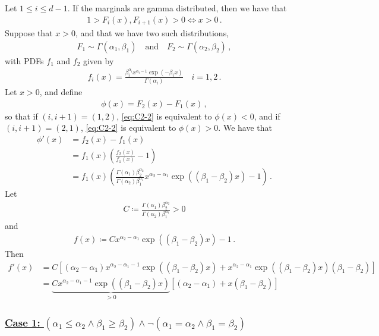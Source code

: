 \documentclass{article}
\begin{document}
%
Let $1 \leq i \leq d - 1$.
If the marginals are gamma distributed, then we have that
%
\begin{align*}
	1 > F_i(x), F_{i+1}(x) > 0 \iff x > 0 \,.
\end{align*}
%
Suppose that $x > 0$, and that we have two such distributions,
%
\begin{align*}
	F_1 \sim \Gamma(\alpha_1, \beta_1) \quad \text{and} \quad
	F_2 \sim \Gamma(\alpha_2, \beta_2) \,,
\end{align*}
%
with PDFs $f_1$ and $f_2$ given by
%
\begin{align*}
	f_i(x) = \frac{\beta_i ^ {\alpha_i} x ^ {\alpha_i - 1}
		\exp(-\beta_i x)}{\Gamma(\alpha_i)} \quad  i = 1, 2 \,.
\end{align*}
%
Let $x > 0$, and define
%
\begin{align*}
	\phi(x) = F_2(x) - F_1(x) \,,
\end{align*}
%
so that if $(i, i + 1) = (1, 2)$,
\eqref{eq:C2-2} is equivalent to $\phi(x) < 0$,
and if $(i, i + 1) = (2, 1)$,
\eqref{eq:C2-2} is equivalent to $\phi(x) > 0$.
%
We have that
%
\begin{align*}
	\phi'(x) &= f_2(x) - f_1(x)\\
	&= f_1(x) \left(\frac{f_2(x)}{f_1(x)} - 1\right)\\
	&= f_1(x) \left(\frac{\Gamma(\alpha_1)\beta ^ {\alpha_2}_2}
		{\Gamma(\alpha_2)\beta ^ {\alpha_1}_1} x^{\alpha_2 - \alpha_1}
		\exp((\beta_1 - \beta_2) x) - 1\right) \,.
\end{align*}
%
Let
%
\begin{align*}
	C \coloneqq \frac{\Gamma(\alpha_1) \beta ^ {\alpha_2}_2}
		{\Gamma(\alpha_2) \beta ^ {\alpha_1}_1} > 0
\end{align*}
%
and
%
\begin{align*}
	f(x) \coloneqq C x ^ {\alpha_2 - \alpha_1}
		\exp((\beta_1 - \beta_2) x) - 1 \,.
\end{align*}
%
Then
%
\begin{align*}
	f'(x) &= C\left[(\alpha_2 - \alpha_1) x ^ {\alpha_2 - \alpha_1 - 1}
		\exp((\beta_1 - \beta_2) x) + x ^ {\alpha_2 - \alpha_1}
		\exp((\beta_1 - \beta_2) x)(\beta_1 - \beta_2) \right]\\
	&=\underbrace{C x ^ {\alpha_2 - \alpha_1 - 1} \exp((\beta_1 - \beta_2) x)}
		_{ > 0} \left[(\alpha_2 - \alpha_1) + x (\beta_1 - \beta_2)\right]
\end{align*}
%
\subsubsection*{\underline{Case 1:
	$(\alpha_1 \leq \alpha_2 \land \beta_1 \geq \beta_2)
	\land \neg (\alpha_1 = \alpha_2 \land \beta_1 = \beta_2)$}}
\end{document}
